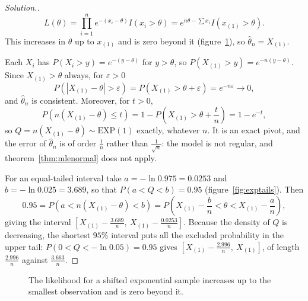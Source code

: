\documentclass[12pt,a4paper]{report}
\theoremstyle{definition}
\newenvironment{solution}
  {\renewcommand{\qedsymbol}{}\begin{proof}[\textit{Solution}.]}
  {\end{proof}}
\begin{document}
\begin{solution}
\[L(\theta) = \prod^n_{i = 1}e^{-(x_i - \theta)}I(x_i>\theta) = e^{n\theta - \sum x_i}I\left(x_{(1)}>\theta\right).\]
This increases in $\theta$ up to $x_{(1)}$ and is zero beyond it
(figure~\ref{fig:shiftedexplik}), so $\hat\theta_n = X_{(1)}$.

Each $X_i$ has $P(X_i>y) = e^{-(y - \theta)}$ for $y>\theta$, so
$P(X_{(1)}>y) = e^{-n(y - \theta)}$. Since $X_{(1)}>\theta$ always, for $\varepsilon>0$
\[P\left(\left|X_{(1)} - \theta\right|>\varepsilon\right) = P\left(X_{(1)}>\theta + \varepsilon\right) = e^{-n\varepsilon}\longrightarrow 0,\]
and $\hat\theta_n$ is consistent. Moreover, for $t>0$,
\[P\left(n(X_{(1)} - \theta)\le t\right) = 1 - P\left(X_{(1)}>\theta + \frac tn\right) = 1 - e^{-t},\]
so $Q = n(X_{(1)} - \theta)\sim\text{EXP}(1)$ exactly, whatever $n$. It is an exact pivot,
and the error of $\hat\theta_n$ is of order $\frac1n$ rather than $\frac{1}{\sqrt n}$: the
model is not regular, and theorem~\ref{thm:mlenormal} does not apply.

For an equal-tailed interval take $a = -\ln 0.975 = 0.0253$ and
$b = -\ln 0.025 = 3.689$, so that $P(a<Q<b) = 0.95$ (figure~\ref{fig:exptails}). Then
\[0.95 = P\left(a<n(X_{(1)} - \theta)<b\right) = P\left(X_{(1)} - \frac bn<\theta<X_{(1)} - \frac an\right),\]
giving the interval $\left[X_{(1)} - \frac{3.689}{n},\ X_{(1)} - \frac{0.0253}{n}\right]$.
Because the density of $Q$ is decreasing, the shortest $95\%$ interval puts all the
excluded probability in the upper tail: $P(0<Q<-\ln 0.05) = 0.95$ gives
$\left[X_{(1)} - \frac{2.996}{n},\ X_{(1)}\right]$, of length $\frac{2.996}{n}$ against
$\frac{3.663}{n}$.
\end{solution}

\begin{figure}[H]
\centering
{}
\caption{The likelihood for a shifted exponential sample increases up to the smallest
observation and is zero beyond it.}
\label{fig:shiftedexplik}
\end{figure}
\end{document}
